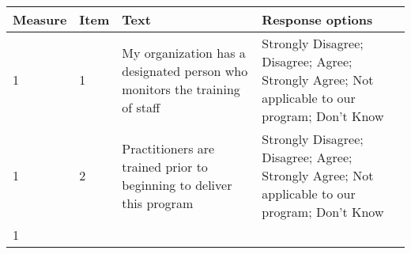 \documentclass[]{article}
\begin{document}
\begin{longtable}[]{@{}llll@{}}
\toprule
\begin{minipage}[b]{0.05\columnwidth}\raggedright\strut
Measure\strut
\end{minipage} & \begin{minipage}[b]{0.04\columnwidth}\raggedright\strut
Item\strut
\end{minipage} & \begin{minipage}[b]{0.41\columnwidth}\raggedright\strut
Text\strut
\end{minipage} & \begin{minipage}[b]{0.39\columnwidth}\raggedright\strut
Response options\strut
\end{minipage}\tabularnewline
\midrule
\endhead
\begin{minipage}[t]{0.05\columnwidth}\raggedright\strut
1\strut
\end{minipage} & \begin{minipage}[t]{0.04\columnwidth}\raggedright\strut
1\strut
\end{minipage} & \begin{minipage}[t]{0.41\columnwidth}\raggedright\strut
My organization has a designated person who monitors the training of
staff\strut
\end{minipage} & \begin{minipage}[t]{0.39\columnwidth}\raggedright\strut
Strongly Disagree; Disagree; Agree; Strongly Agree; Not applicable to
our program; Don't Know\strut
\end{minipage}\tabularnewline
\begin{minipage}[t]{0.05\columnwidth}\raggedright\strut
1\strut
\end{minipage} & \begin{minipage}[t]{0.04\columnwidth}\raggedright\strut
2\strut
\end{minipage} & \begin{minipage}[t]{0.41\columnwidth}\raggedright\strut
Practitioners are trained prior to beginning to deliver this
program\strut
\end{minipage} & \begin{minipage}[t]{0.39\columnwidth}\raggedright\strut
Strongly Disagree; Disagree; Agree; Strongly Agree; Not applicable to
our program; Don't Know\strut
\end{minipage}\tabularnewline
\begin{minipage}[t]{0.05\columnwidth}\raggedright\strut
1\strut
\end{minipage} & \begin{minipage}[t]{0.04\columnwidth}\raggedright\strut

\end{minipage}
\end{longtable}
\end{document}
